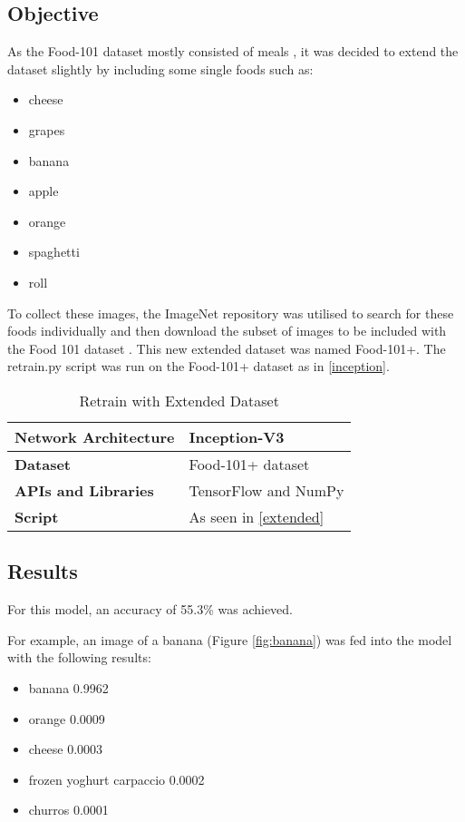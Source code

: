 \tocless\subsection{Objective}
As the Food-101 dataset mostly consisted of meals \parencite{food101}, it was decided to extend the
dataset slightly by including some single foods such as:
\begin{itemize}
    \item{cheese}
    \item{grapes}
    \item{banana}
    \item{apple}
    \item{orange}
    \item{spaghetti}
    \item{roll}
\end{itemize}

To collect these images, the ImageNet repository was utilised to search for
these foods individually and then download the subset of images to be included
with the Food 101 dataset \parencite{imagenet}.
This new extended dataset was named Food-101+.
The retrain.py script was run on the Food-101+ dataset as in
\ref{inception}.

\begin{table}[h]
\centering
\caption{Retrain with Extended Dataset}
\label{my-label}
\begin{tabular}{|l|p{8cm}|}
\hline
\textbf{Network Architecture} & Inception-V3           \\ \hline
\textbf{Dataset}              & Food-101+ dataset \\ \hline
\textbf{APIs and Libraries}   & TensorFlow and NumPy                                                       \\ \hline
\textbf{Script}   & As seen in \ref{extended}                                                     \\ \hline

\end{tabular}
\end{table}

\tocless\subsection{Results}
For this model, an accuracy of 55.3\% was achieved.

For example, an image of a banana (Figure \ref{fig:banana}) was fed into the model with
the following results:
\begin{itemize}
    \item{banana 0.9962}
    \item{orange 0.0009}
    \item{cheese 0.0003}
    \item{frozen yoghurt carpaccio 0.0002}
    \item{churros 0.0001}
\end{itemize}
 
